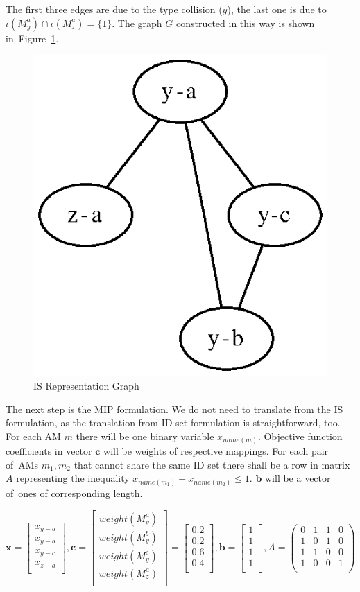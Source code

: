 The first three edges are due to the type collision ($y$), the last one is due to~$\iota(M_{y}^{a}) \cap \iota(M_{z}^{a}) = \{1\}$. The graph $G$ constructed in this way is shown in~Figure~\ref{image-mip-is-graph}.

\begin{figure}
  \centering
	\includegraphics[width=.25\textwidth]{images/is-representation}
  \caption{IS Representation Graph}
  \label{image-mip-is-graph}
\end{figure}

The next step is the MIP formulation. We do not need to translate from the IS formulation, as the translation from ID set formulation is straightforward, too. For each AM $m$ there will be one binary variable $x_{name(m)}$. Objective function coefficients in vector $\mathbf{c}$ will be weights of respective mappings. For each pair of~AMs $m_1, m_2$ that cannot share the same ID set there shall be a row in matrix $A$ representing the inequality $x_{name(m_1)} + x_{name(m_2)} \leqslant 1$. $\mathbf{b}$ will be a vector of~ones of corresponding length.

\[
\mathbf{x} =
\begin{bmatrix}
x_{y-a} \\
x_{y-b} \\
x_{y-c} \\
x_{z-a} \\
\end{bmatrix},
\mathbf{c} = 
\begin{bmatrix}
weight(M_{y}^{a}) \\
weight(M_{y}^{b}) \\
weight(M_{y}^{c}) \\
weight(M_{z}^{a}) \\
\end{bmatrix} =
\begin{bmatrix}
0.2 \\
0.2 \\
0.6 \\
0.4 \\
\end{bmatrix},
\mathbf{b} =
\begin{bmatrix}
1 \\
1 \\
1 \\
1 \\
\end{bmatrix},
A =
\begin{pmatrix}
0 & 1 & 1 & 0 \\
1 & 0 & 1 & 0 \\
1 & 1 & 0 & 0 \\
1 & 0 & 0 & 1 \\
\end{pmatrix}
\]

